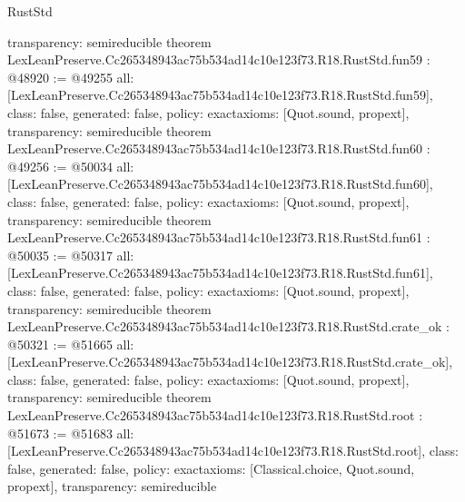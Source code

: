 \begin{lexlean}{RustStd}
\begin{coremodule}
{  transparency: semireducible
}
theorem LexLeanPreserve.Cc265348943ac75b534ad14c10e123f73.R18.RustStd.fun59 : @48920 := @49255 {
  all: [LexLeanPreserve.Cc265348943ac75b534ad14c10e123f73.R18.RustStd.fun59],
  class: false,
  generated: false,
  policy: exact{axioms: [Quot.sound, propext]},
  transparency: semireducible
}
theorem LexLeanPreserve.Cc265348943ac75b534ad14c10e123f73.R18.RustStd.fun60 : @49256 := @50034 {
  all: [LexLeanPreserve.Cc265348943ac75b534ad14c10e123f73.R18.RustStd.fun60],
  class: false,
  generated: false,
  policy: exact{axioms: [Quot.sound, propext]},
  transparency: semireducible
}
theorem LexLeanPreserve.Cc265348943ac75b534ad14c10e123f73.R18.RustStd.fun61 : @50035 := @50317 {
  all: [LexLeanPreserve.Cc265348943ac75b534ad14c10e123f73.R18.RustStd.fun61],
  class: false,
  generated: false,
  policy: exact{axioms: [Quot.sound, propext]},
  transparency: semireducible
}
theorem LexLeanPreserve.Cc265348943ac75b534ad14c10e123f73.R18.RustStd.crate_ok : @50321 := @51665 {
  all: [LexLeanPreserve.Cc265348943ac75b534ad14c10e123f73.R18.RustStd.crate_ok],
  class: false,
  generated: false,
  policy: exact{axioms: [Quot.sound, propext]},
  transparency: semireducible
}
theorem LexLeanPreserve.Cc265348943ac75b534ad14c10e123f73.R18.RustStd.root : @51673 := @51683 {
  all: [LexLeanPreserve.Cc265348943ac75b534ad14c10e123f73.R18.RustStd.root],
  class: false,
  generated: false,
  policy: exact{axioms: [Classical.choice, Quot.sound, propext]},
  transparency: semireducible
}


\end{coremodule}
\end{lexlean}
